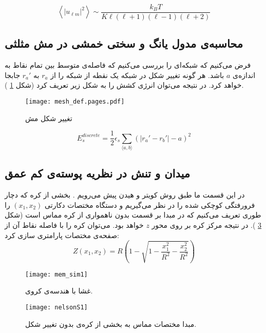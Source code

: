 \begin{equation}
\left\langle|u_{\ell m}|^2\right\rangle\sim\frac{k_BT}{K\ell(\ell+1)(\ell-1)(\ell+2)}
\end{equation}








\subsection{محاسبه‌ی مدول یانگ و سختی خمشی در مش مثلثی}
فرض می‌کنیم که شبکه‌ای را بررسی می‌کنیم که فاصله‌ی متوسط بین تمام نقاط به اندازه‌ی $a$ باشد. هر گونه تغییر شکل در شبکه یک نقطه از شبکه را از $r_a$ به $r_a'$ جابجا خواهد کرد. در نتیجه می‌توان انرژی کشش را به شکل زیر تعریف کرد (شکل
\ref{fig:mesh_def}
).
\begin{figure}[h]
\begin{center}
\texttt{[image: mesh\_def.pages.pdf]}
\caption{
تغییر شکل مش
}
\label{fig:mesh_def}
\end{center}
\end{figure}

\begin{equation}
E_s^{discrete}=\frac{1}{2}\epsilon_s\sum_{\langle a,b\rangle}\left(|r_a'-r_b'|-a\right)^2
\end{equation}













\subsection{میدان و تنش در نظریه پوسته‌ی کم عمق}
در این قسمت ما طبق روش کویتر
و
هیدن
پیش می‌‌رویم
\cite{Heijden2008WTK}
. بخشی از کره که دچار فرورفتگی کوچکی شده را در نظر می‌گیریم و دستگاه مختصات دکارتی 
$(x_1,x_2)$
را طوری تعریف می‌کنیم که در مبدا بر قسمت بدون ناهمواری از کره مماس است (شکل 
\ref{fig:nelson_figs1}
). در نتیجه مرکز کره بر روی محور 
$z$
خواهد بود. می‌توان کره را با فاصله نقاط آن از صفحه‌ی مختصات پارامتری سازی کرد:
\begin{equation}
Z(x_1,x_2) = R\left(1-\sqrt{1-\frac{x_1^2}{R^2}-\frac{x_2^2}{R^2}}\right)
\label{eq:nelsonS1}
\end{equation}
\begin{figure}[h]
\begin{center}
\texttt{[image: mem\_sim1]}
\caption{
غشا با هندسه‌ی کروی.
}
\label{fig:mem1}
\end{center}
\end{figure}
\begin{figure}[h]
\begin{center}
\texttt{[image: nelsonS1]}
\caption{
مبدا مختصات مماس به بخشی از کره‌ی بدون تغییر شکل.ٓ
}
\label{fig:nelson_figs1}
\end{center}
\end{figure}

